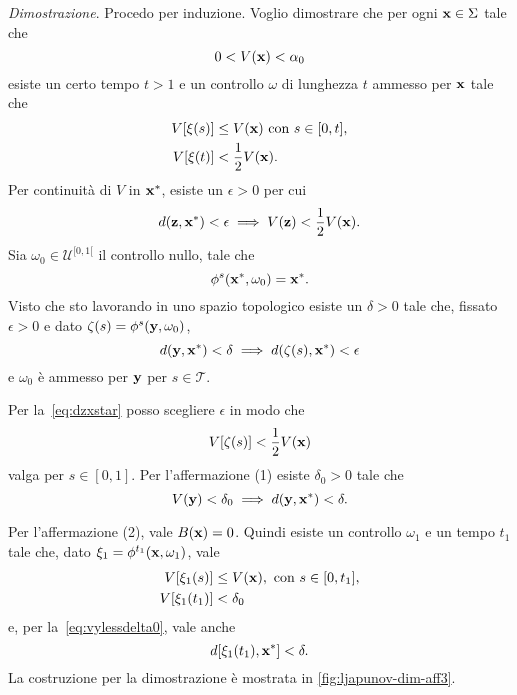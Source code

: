 \begin{steps}
    \emph{Dimostrazione}.
    Procedo per induzione.
    Voglio dimostrare che  per ogni $\mathbf{x} \in \Sigma$ tale che
    \begin{equation*}
        0 < V(\mathbf{x}) < \alpha_0
    \end{equation*}
    esiste un certo tempo $t > 1$ e un controllo $\omega$
    di lunghezza $t$ ammesso per $\mathbf{x}$ tale che
    \begin{align*}
        V[\xi(s)] &\leq V(\mathbf{x}) \text{ con } s \in [0, t], \\
        V[\xi(t)] &< \frac 1 2 V(\mathbf{x}).
    \end{align*}
    Per continuità di $V$ in $\mathbf{x}^*$, esiste un $\epsilon > 0$ per cui
    \begin{equation}
        d(\mathbf{z}, \mathbf{x}^*) < \epsilon \implies V(\mathbf{z}) < \frac 1 2 V(\mathbf{x}).
        \label{eq:dzxstar}
    \end{equation}
    Sia $\omega_0 \in \mathcal U^{[0, 1[}$ il controllo nullo,
    tale che
    \begin{equation*}
        \phi^s(\mathbf{x}^*, \omega_0) = \mathbf{x}^*.
    \end{equation*}
    Visto che sto lavorando in uno spazio topologico
    esiste un $\delta > 0$ tale che, fissato $\epsilon > 0$ e
    dato $\zeta(s) = \phi^s(\mathbf{y}, \omega_0)$,
    \begin{equation*}
        d(\mathbf{y}, \mathbf{x}^*) < \delta \implies d(\zeta(s), \mathbf{x}^*) < \epsilon
    \end{equation*}
    e $\omega_0$ è ammesso per $\mathbf{y}$ per $s \in \mathcal T$.

    Per la~\eqref{eq:dzxstar} posso scegliere $\epsilon$ in modo che
    \begin{equation*}
        V[\zeta(s)] < \frac 1 2 V(\mathbf{x})
    \end{equation*}
    valga per $s \in [0, 1]$.
    Per l'affermazione (1) esiste $\delta_0 > 0$ tale che
    \begin{equation}
        V(\mathbf{y}) < \delta_0 \implies d(\mathbf{y}, \mathbf{x}^*) < \delta.
        \label{eq:vylessdelta0}
    \end{equation}

    Per l'affermazione (2), vale $B(\mathbf{x}) = 0$.
    Quindi esiste un controllo $\omega_1$ e un tempo $t_1$ tale
    che, dato $\xi_1 = \phi^{t_1}(\mathbf{x}, \omega_1)$, vale
    \begin{align*}
        V[\xi_1(s)] &\leq V(\mathbf{x}), \text{ con } s \in [0, t_1],\\
        V[\xi_1(t_1)] &< \delta_0
    \end{align*}
    e, per la~\eqref{eq:vylessdelta0}, vale anche
    \begin{equation*}
        d[\xi_1(t_1), \mathbf{x}^*] < \delta.
    \end{equation*}
    La costruzione per la dimostrazione è mostrata in \autoref{fig:ljapunov-dim-aff3}.


\end{steps}
